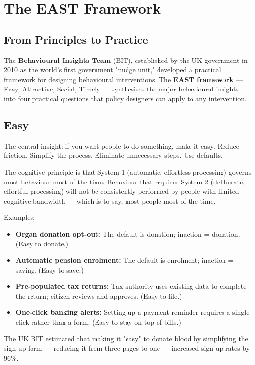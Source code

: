 \documentclass[12pt, letterpaper]{article}
\begin{document}
\medskip


\section{The EAST Framework}



\subsection{From Principles to Practice}


The \textbf{Behavioural Insights Team} (BIT), established by the UK government in 2010 as the world's first government "nudge unit," developed a practical framework for designing behavioural interventions. The \textbf{EAST framework} --- Easy, Attractive, Social, Timely --- synthesises the major behavioural insights into four practical questions that policy designers can apply to any intervention.


\subsection{Easy}


The central insight: if you want people to do something, make it easy. Reduce friction. Simplify the process. Eliminate unnecessary steps. Use defaults.

The cognitive principle is that System 1 (automatic, effortless processing) governs most behaviour most of the time. Behaviour that requires System 2 (deliberate, effortful processing) will not be consistently performed by people with limited cognitive bandwidth --- which is to say, most people most of the time.

Examples:
\begin{itemize}
\item \textbf{Organ donation opt-out:} The default is donation; inaction = donation. (Easy to donate.)
\item \textbf{Automatic pension enrolment:} The default is enrolment; inaction = saving. (Easy to save.)
\item \textbf{Pre-populated tax returns:} Tax authority uses existing data to complete the return; citizen reviews and approves. (Easy to file.)
\item \textbf{One-click banking alerts:} Setting up a payment reminder requires a single click rather than a form. (Easy to stay on top of bills.)
\end{itemize}

The UK BIT estimated that making it "easy" to donate blood by simplifying the sign-up form --- reducing it from three pages to one --- increased sign-up rates by 96\%.
\end{document}
